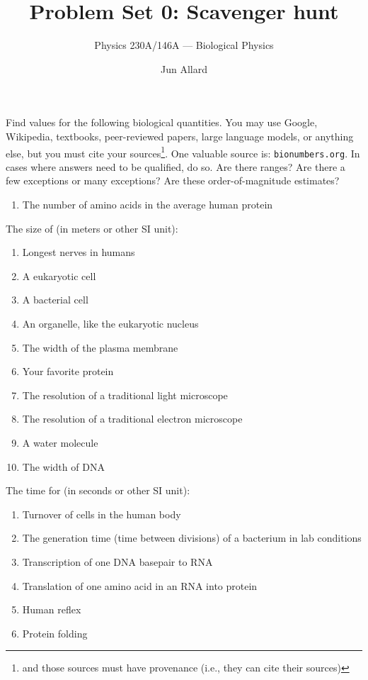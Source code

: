 \documentclass[
  letterpaper,
  DIV=11,
  numbers=noendperiod]{scrartcl}
\title{Problem Set 0: Scavenger hunt}
\subtitle{Physics 230A/146A --- Biological Physics}
\author{Jun Allard}
\date{}
\providecommand{\tightlist}{%
  \setlength{\itemsep}{0pt}\setlength{\parskip}{0pt}}
\begin{document}
\maketitle


Find values for the following biological quantities.
You may use Google, Wikipedia, textbooks, peer-reviewed papers, large language models, or anything else, but you must cite your sources\footnote{and those sources must have provenance (i.e., they can cite their sources)}.
One valuable source is: \texttt{bionumbers.org}.
In cases where answers need to be qualified, do so.
Are there ranges? Are there a few exceptions or many exceptions?
Are these order-of-magnitude estimates?

\begin{enumerate}
\def\labelenumi{\arabic{enumi}.}
\tightlist
\item
  The number of amino acids in the average human protein
\end{enumerate}

The size of (in meters or other SI unit):

\begin{enumerate}
\def\labelenumi{\arabic{enumi}.}
\setcounter{enumi}{1}
\tightlist
\item
  Longest nerves in humans
\item
  A eukaryotic cell
\item
  A bacterial cell
\item
  An organelle, like the eukaryotic nucleus
\item
  The width of the plasma membrane
\item
  Your favorite protein
\item
  The resolution of a traditional light microscope
\item
  The resolution of a traditional electron microscope
\item
  A water molecule
\item
  The width of DNA
\end{enumerate}

The time for (in seconds or other SI unit):

\begin{enumerate}
\def\labelenumi{\arabic{enumi}.}
\setcounter{enumi}{11}
\tightlist
\item
  Turnover of cells in the human body
\item
  The generation time (time between divisions) of a bacterium in lab conditions
\item
  Transcription of one DNA basepair to RNA
\item
  Translation of one amino acid in an RNA into protein
\item
  Human reflex
\item
  Protein folding
\end{enumerate}
\end{document}
